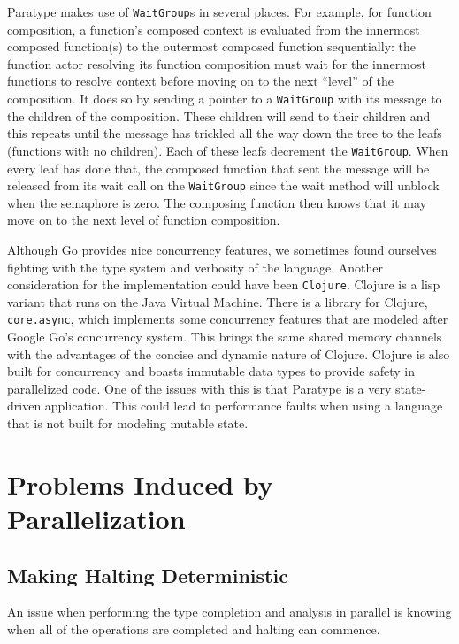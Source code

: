 \documentclass{acm_proc_article-sp}
\begin{document}
Paratype makes use of \texttt{WaitGroup}s in several places. For example, for
function composition, a function's composed context is evaluated from the
innermost composed function(s) to the outermost composed function sequentially:
the function actor resolving its function composition must wait for the
innermost functions to resolve context before moving on to the next ``level''
of the composition. It does so by sending a pointer to a \texttt{WaitGroup}
with its message to the children of the composition. These children will send
to their children and this repeats until the message has trickled all the way
down the tree to the leafs (functions with no children). Each of these leafs
decrement the \texttt{WaitGroup}. When every leaf has done that, the
composed function that sent the message will be released from its wait call on
the \texttt{WaitGroup} since the wait method will unblock when the semaphore is
zero. The composing function then knows that it may move on to the next level
of function composition.


Although Go provides nice concurrency features, we sometimes found ourselves
fighting with the type system and verbosity of the language. Another
consideration for the implementation could have been \texttt{Clojure}. Clojure
is a lisp variant that runs on the Java Virtual Machine. There is a library for
Clojure, \texttt{core.async}, which implements some concurrency features that
are  modeled after Google Go's concurrency system. This brings the same shared
memory channels with the advantages of the concise and dynamic nature of
Clojure. Clojure is also built for concurrency and boasts immutable data types
to provide safety in parallelized code. One of the issues with this is that
Paratype is a very state-driven application. This could lead to performance
faults when using a language that is not built for modeling mutable state.

\section{Problems Induced by Parallelization}
	\subsection{Making Halting Deterministic}
		An issue when performing the type completion and analysis in parallel
		is knowing when all of the operations are completed and halting can
		commence. 
		
\end{document}
